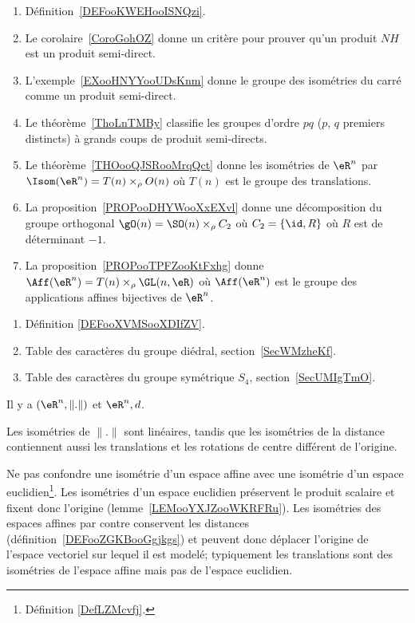     \begin{enumerate}
        \item
            Définition~\ref{DEFooKWEHooISNQzi}.         %
        \item
            Le corolaire~\ref{CoroGohOZ} donne un critère pour prouver qu'un produit \( NH\) est un produit semi-direct.
        \item
            L'exemple~\ref{EXooHNYYooUDsKnm} donne le groupe des isométries du carré comme un produit semi-direct.
        \item
            Le théorème~\ref{ThoLnTMBy} classifie les groupes d'ordre \( pq\) (\( p\), \( q\) premiers distincts) à grands coups de produit semi-directs.
        \item
            Le théorème~\ref{THOooQJSRooMrqQct} donne les isométries de \( \eR^n\) par \( \Isom(\eR^n)=T(n)\times_{\rho} O(n)\) où \( T(n)\) est le groupe des translations.
        \item
            La proposition~\ref{PROPooDHYWooXxEXvl} donne une décomposition du groupe orthogonal \( \gO(n)=\SO(n)\times_{\rho} C_2\) où \( C_2=\{ \id,R \}\) où \( R\) est de déterminant \( -1\).
        \item
            La proposition~\ref{PROPooTPFZooKtFxhg} donne \( \Aff(\eR^n)=T(n)\times_{\rho}\GL(n,\eR)\) où \( \Aff(\eR^n)\) est le groupe des applications affines bijectives de \( \eR^n\).
        \end{enumerate}


\begin{enumerate}
    \item Définition \ref{DEFooXVMSooXDIfZV}.
    \item Table des caractères du groupe diédral, section~\ref{SecWMzheKf}.
    \item Table des caractères du groupe symétrique \( S_4\), section~\ref{SecUMIgTmO}.
\end{enumerate}


      \label{THMooVUCLooCrdbxm}

Il y a \( (\eR^n,\| . \|)\) et \( \eR^n,d\).

Les isométries de \( \| . \|\) sont linéaires, tandis que les isométries de la distance contiennent aussi les translations et les rotations de centre différent de l'origine.

Ne pas confondre une isométrie d'un espace affine avec une isométrie d'un espace euclidien\footnote{Définition \ref{DefLZMcvfj}.}. Les isométries d'un espace euclidien préservent le produit scalaire et fixent donc l'origine (lemme~\ref{LEMooYXJZooWKRFRu}). Les isométries des espaces affines par contre conservent les distances (définition~\ref{DEFooZGKBooGgjkgs}) et peuvent donc déplacer l'origine de l'espace vectoriel sur lequel il est modelé; typiquement les translations sont des isométries de l'espace affine mais pas de l'espace euclidien.

